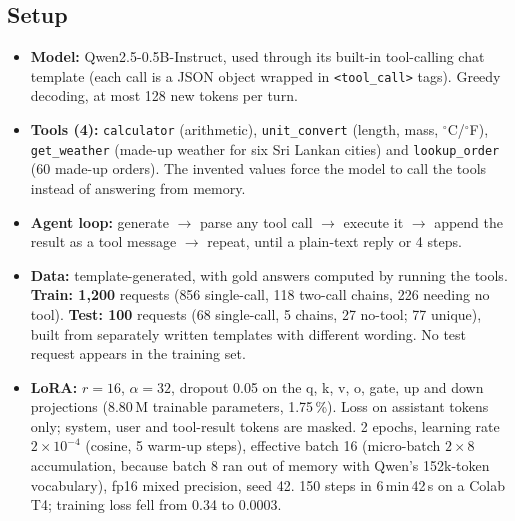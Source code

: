 \documentclass[12pt,a4paper]{article}
\begin{document}
\subsection{Setup}
\begin{itemize}
    \item \textbf{Model:} Qwen2.5-0.5B-Instruct, used through its built-in tool-calling chat template (each call is a JSON object wrapped in \verb|<tool_call>| tags). Greedy decoding, at most 128 new tokens per turn.
    \item \textbf{Tools (4):} \verb|calculator| (arithmetic), \verb|unit_convert| (length, mass, $^\circ$C/$^\circ$F), \verb|get_weather| (made-up weather for six Sri Lankan cities) and \verb|lookup_order| (60 made-up orders). The invented values force the model to call the tools instead of answering from memory.
    \item \textbf{Agent loop:} generate $\rightarrow$ parse any tool call $\rightarrow$ execute it $\rightarrow$ append the result as a tool message $\rightarrow$ repeat, until a plain-text reply or 4 steps.
    \item \textbf{Data:} template-generated, with gold answers computed by running the tools. \textbf{Train: 1{,}200} requests (856 single-call, 118 two-call chains, 226 needing no tool). \textbf{Test: 100} requests (68 single-call, 5 chains, 27 no-tool; 77 unique), built from separately written templates with different wording. No test request appears in the training set.
    \item \textbf{LoRA:} $r=16$, $\alpha=32$, dropout 0.05 on the q, k, v, o, gate, up and down projections (8.80\,M trainable parameters, 1.75\,\%). Loss on assistant tokens only; system, user and tool-result tokens are masked. 2 epochs, learning rate $2\times10^{-4}$ (cosine, 5 warm-up steps), effective batch 16 (micro-batch $2\times8$ accumulation, because batch 8 ran out of memory with Qwen's 152k-token vocabulary), fp16 mixed precision, seed 42. 150 steps in 6\,min\,42\,s on a Colab T4; training loss fell from 0.34 to 0.0003.
\end{itemize}
\end{document}
